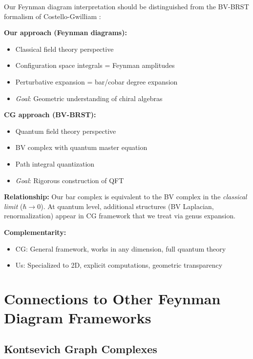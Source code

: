 \begin{remark}\label{rem:feynman-vs-bv}
Our Feynman diagram interpretation should be distinguished from the BV-BRST 
formalism of Costello-Gwilliam \cite{CG17}:

\textbf{Our approach (Feynman diagrams):}
\begin{itemize}
\item Classical field theory perspective
\item Configuration space integrals = Feynman amplitudes
\item Perturbative expansion = bar/cobar degree expansion
\item \emph{Goal}: Geometric understanding of chiral algebras
\end{itemize}

\textbf{CG approach (BV-BRST):}
\begin{itemize}
\item Quantum field theory perspective
\item BV complex with quantum master equation
\item Path integral quantization
\item \emph{Goal}: Rigorous construction of QFT
\end{itemize}

\textbf{Relationship:} Our bar complex is equivalent to the BV complex in the 
\emph{classical limit} ($\hbar \to 0$). At quantum level, additional structures 
(BV Laplacian, renormalization) appear in CG framework that we treat via genus 
expansion.

\textbf{Complementarity:}
\begin{itemize}
\item CG: General framework, works in any dimension, full quantum theory
\item Us: Specialized to 2D, explicit computations, geometric transparency
\end{itemize}
\end{remark}

\section{Connections to Other Feynman Diagram Frameworks}
\label{sec:connections-other-feynman}

\subsection{Kontsevich Graph Complexes}

